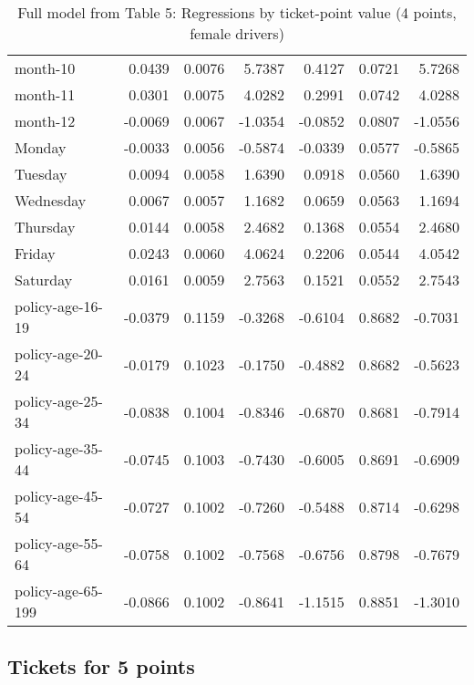 \documentclass[10pt]{article}
\begin{document}
\begin{table}[ht]
\begin{tabular}{lrrrrrr}
  month-10 & 0.0439 & 0.0076 & 5.7387 & 0.4127 & 0.0721 & 5.7268 \\ 
  month-11 & 0.0301 & 0.0075 & 4.0282 & 0.2991 & 0.0742 & 4.0288 \\ 
  month-12 & -0.0069 & 0.0067 & -1.0354 & -0.0852 & 0.0807 & -1.0556 \\ 
  Monday & -0.0033 & 0.0056 & -0.5874 & -0.0339 & 0.0577 & -0.5865 \\ 
  Tuesday & 0.0094 & 0.0058 & 1.6390 & 0.0918 & 0.0560 & 1.6390 \\ 
  Wednesday & 0.0067 & 0.0057 & 1.1682 & 0.0659 & 0.0563 & 1.1694 \\ 
  Thursday & 0.0144 & 0.0058 & 2.4682 & 0.1368 & 0.0554 & 2.4680 \\ 
  Friday & 0.0243 & 0.0060 & 4.0624 & 0.2206 & 0.0544 & 4.0542 \\ 
  Saturday & 0.0161 & 0.0059 & 2.7563 & 0.1521 & 0.0552 & 2.7543 \\ 
  policy-age-16-19 & -0.0379 & 0.1159 & -0.3268 & -0.6104 & 0.8682 & -0.7031 \\ 
  policy-age-20-24 & -0.0179 & 0.1023 & -0.1750 & -0.4882 & 0.8682 & -0.5623 \\ 
  policy-age-25-34 & -0.0838 & 0.1004 & -0.8346 & -0.6870 & 0.8681 & -0.7914 \\ 
  policy-age-35-44 & -0.0745 & 0.1003 & -0.7430 & -0.6005 & 0.8691 & -0.6909 \\ 
  policy-age-45-54 & -0.0727 & 0.1002 & -0.7260 & -0.5488 & 0.8714 & -0.6298 \\ 
  policy-age-55-64 & -0.0758 & 0.1002 & -0.7568 & -0.6756 & 0.8798 & -0.7679 \\ 
  policy-age-65-199 & -0.0866 & 0.1002 & -0.8641 & -1.1515 & 0.8851 & -1.3010 \\ 
   \hline
\end{tabular}
\caption{Full model from Table 5: Regressions by ticket-point value (4 points, female drivers)} 
\label{tab_5_4_pts_F}
\end{table}


\clearpage
\pagebreak




\subsection{Tickets for 5 points}



\end{document}
